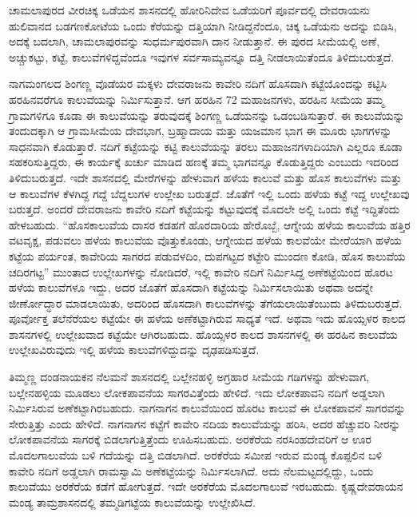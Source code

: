 ಚಾಮಲಾಪುರದ ವೀರಚಿಕ್ಕ ಒಡೆಯನ ಶಾಸನದಲ್ಲಿ ಹೋರಿನಿದೇವ ಒಡೆಯರಿಗೆ ಪೂರ್ವದಲ್ಲಿ ದೇವರಾಯನು ಹುಲಿವಾನದ ಬಡಗಣಕೋಟೆಯ ಒಂದು ಕೆರೆಯನ್ನು ದತ್ತಿಯಾಗಿ ನೀಡಿದ್ದನೆಂದೂ, ಚಿಕ್ಕ ಒಡೆಯನು ಅದನ್ನು ಬಿಡಿಸಿ, ಅದಕ್ಕೆ ಬದಲಾಗಿ, ಚಾಮಲಾಪುರವನ್ನು ಸುಧರ್ಮಪುರವಾಗಿ ದಾನ ನೀಡುತ್ತಾನೆ. ಈ ಪುರದ ಸೀಮೆಯಲ್ಲಿ ಅಣೆ, ಅಚ್ಚುಕಟ್ಟು, ಕಟ್ಟೆ, ಕಾಲುವೆಗಳಿದ್ದವೆಂದೂ ಇವುಗಳ ಸರ್ವಸಾಮ್ಯವನ್ನೂ ದತ್ತಿ ನೀಡಲಾಯಿತೆಂದೂ ತಿಳಿದುಬರುತ್ತದೆ.

ನಾಗಮಂಗಲದ ಶಿಂಗಣ್ಣ ವೊಡೆಯರ ಮಕ್ಕಳು ದೇವರಾಜನು ಕಾವೇರಿ ನದಿಗೆ ಹೊಸದಾಗಿ ಕಟ್ಟೆಯೊಂದನ್ನು ಕಟ್ಟಿಸಿ ಹರಹಿನವರೆಗೂ ಕಾಲುವೆಯನ್ನು ನಿರ್ಮಿಸುತ್ತಾನೆ. ಆಗ ಹರಹಿನ 72 ಮಹಾಜನಗಳು, ಹರಹಿನ ಸೀಮೆಯ ತಮ್ಮ ಗ್ರಾಮಗಳಿಗೂ ಕೂಡಾ ಈ ಕಾಲುವೆಯನ್ನು ತರುವುದಕ್ಕೆ ಶಿಂಗಣ್ಣ ಒಡೆಯನನ್ನು ಒಡಂಬಡಿಸುತ್ತಾರೆ. ಈ ಕಾಲುವೆಯನ್ನು ತಂದುದಕ್ಕಾಗಿ ಆ ಗ್ರಾಮಸೀಮೆಯ ದೇವಭಾಗ, ಬ್ರಹ್ಮಾದಾಯ ಮತ್ತು ಯಜಮಾನ ಭಾಗ ಈ ಮೂರು ಭಾಗಗಳನ್ನು ಸಾಧನವಾಗಿ ಕೊಡುತ್ತಾರೆ. ನದಿಗೆ ಕಟ್ಟೆಯನ್ನು ಕಟ್ಟಿ ಕಾಲುವೆಯನ್ನು ತರಲು ಮಹಾಜನಗಳಾದಿಯಾಗಿ ಎಲ್ಲರೂ ಕೂಡಾ ಸಹಕರಿಸುತ್ತಿದ್ದರು, ಈ ಕಾರ್ಯಕ್ಕೆ ಖರ್ಚು ಮಾಡಿದ ಹಣಕ್ಕೆ ತಮ್ಮ ಭಾಗವನ್ನೂ ಕೊಡುತ್ತಿದ್ದರು ಎಂಬುದು ಇದರಿಂದ ತಿಳಿದುಬರುತ್ತದೆ. ಇದೇ ಶಾಸನದಲ್ಲಿ ಮೇರೆಗಳನ್ನು ಹೇಳುವಾಗ ಹಳೆಯ ಕಾಲುವೆ ಮತ್ತು ಹೊಸ ಕಾಲುವೆಗಳು ಮತ್ತು ಆ ಕಾಲುವೆಗಳ ಕೆಳಗಿದ್ದ ಗದ್ದೆ ಬೆದ್ದಲುಗಳ ಉಲ್ಲೇಖ ಬರುತ್ತದೆ. ಜೊತೆಗೆ ಇಲ್ಲಿ ಒಂದು ಹಳೆಯ ಕಟ್ಟೆ ಇದ್ದ ಉಲ್ಲೇಖವು ಬರುತ್ತದೆ. ಅಂದರೆ ದೇವರಾಜನು ಕಾವೇರಿ ನದಿಗೆ ಕಟ್ಟೆಯನ್ನು ಕಟ್ಟುವುದಕ್ಕೆ ಮೊದಲೇ ಅಲ್ಲಿ ಒಂದು ಕಟ್ಟೆ ಇದ್ದಿತೆಂದು ಹೇಳಬಹುದು. “ಹೊಸಕಾಲುವೆಯ ದಾಸರ ಕಡಹಗೆ ಹೊರದಾರಿಯ ಹೇರೊಬ್ಬೆ, ಆಗ್ನೇಯ ಹಳೆಯ ಕಾಲುವೆಯ ಹತ್ತಿರ ವಟವೃಕ್ಷ, ಪಡುವಲು ಹಳೆಯ ಕಾಲುವೆಯ ವೊತ್ತುಕೊಂಡು, ಆಗ್ನೇಯದ ಹಳೆಯ ಕಾಲವೆಯೇ ಮೇರೆಯಾಗಿ ಹಳೆಯ ಕಟ್ಟೆಯ ಪರ್ಯಂತ, ಕಾವೇರಿಯ ಸಾಗರದ ಪಡುವಳದಿಂ, ದುಪಗಟ್ಟದ ಕಟ್ಟೇರಿ ಮುಂದಣ ಕೋಡಿ, ಹೊಸ ಕಾಲುವೆಯ ಚದಿರಗಟ್ಟ” ಮುಂತಾದ ಉಲ್ಲೇಖಗಳನ್ನು ನೋಡಿದರೆ, ಇಲ್ಲಿ ಕಾವೇರಿ ನದಿಗೆ ನಿರ್ಮಿಸಿದ್ದ ಅಣೆಕಟ್ಟೆಯಿಂದ ಹೊರಟ ಹಳೆಯ ಕಾಲುವೆಗಳೂ ಇದ್ದು, ಅದರ ಜೊತೆಗೆ ಹೊಸದಾಗಿ ಕಟ್ಟೆಯನ್ನು ನಿರ್ಮಿಸಲಾಯಿತು ಅಥವಾ ಅದನ್ನೇ ಜೀರ್ಣೋದ್ಧಾರ ಮಾಡಲಾಯಿತು, ಅದರಿಂದ ಹೊಸದಾಗಿ ಕಾಲುವೆಗಳನ್ನು ತೆಗೆಯಲಾಯಿತೆಂಬುದು ತಿಳಿದುಬರುತ್ತದೆ. ಪೂರ್ವೋಕ್ತ ತಲೆನೆರೆಯಲ ಕಟ್ಟೆಯೇ ಈ ಹಳೆಯ ಅಣೆಕಟ್ಟಾಗಿರುವ ಸಾಧ್ಯತೆ ಇದೆ. ಅಥವಾ ಇದು ಹೊಯ್ಸಳರ ಕಾಲದ ಶಾಸನಗಳಲ್ಲಿ ಉಲ್ಲೇಖವಾದ ಕಟ್ಟೆಯೇ ಆಗಿರಬಹುದು. ಹೊಯ್ಸಳರ ಕಾಲದ ಶಾಸನಗಳಲ್ಲಿ ಈ ಹರಹಿನ ಕಾಲುವೆಯ ಉಲ್ಲೇಖವಿರುವುದು ಇಲ್ಲಿ ಹಳೆಯ ಕಾಲುವೆಗಳಿದ್ದುದನ್ನು ದೃಢಪಡಿಸುತ್ತದೆ.

ತಿಮ್ಮಣ್ಣ ದಂಡನಾಯಕನ ನೆಲಮನೆ ಶಾಸನದಲ್ಲಿ ಬಲ್ಲೇನಹಳ್ಳಿ ಅಗ್ರಹಾರ ಸೀಮೆಯ ಗಡಿಗಳನ್ನು ಹೇಳುವಾಗ, ಬಲ್ಲೇನಹಳ್ಳಿಯ ಮೂಡಲು ಲೋಕಪಾವನೆಯ ಸಾಗರವಿತ್ತೆಂದು ಹೇಳಿದೆ. ಇದು ಲೋಕಪಾವನಿ ನದಿಗೆ ಅಡ್ಡಲಾಗಿ ನಿರ್ಮಿಸಿರುವ ಅಣೆಕಟ್ಟಾಗಿರಬಹುದು. ನಾಗನಾಗನ ಕಾಲುವೆಯಿಂದ ಹೊರಟ ಕಾಲುವೆ ಈ ಲೋಕಪಾವನೆ ಸಾಗರವನ್ನು ಸೇರುತ್ತಿತ್ತು ಎಂದು ಹೇಳಿದೆ. ನಾಗನಾಗನ ಕಟ್ಟೆಗೆ ಕಾವೇರಿ ನದಿಯ ಕಾಲುವೆಯನ್ನು ಹರಿಸಿ, ಅದರ ಹೆಚ್ಚುವರಿ ನೀರನ್ನು ಲೋಕಪಾವನೆಯ ಸಾಗರಕ್ಕೆ ಬಿಡಲಾಗುತ್ತಿತ್ತೆಂದು ಊಹಿಸಬಹುದು. ಅರಕೆರೆಯ ನರಸಿಂಹದೇವರಿಗೆ ಆ ಊರ ಮೊದಲಗಾಲುವೆಯ ಬಳಿ ಗದೆಯನ್ನು ದತ್ತಿ ಬಿಡಲಾಗಿದೆ.  ಅರಕೆರೆಯ ಸಮೀಪ ಇರುವ ಮಂಡ್ಯ ಕೊಪ್ಪಲಿನ ಬಳಿ ಕಾವೇರಿ ನದಿಗೆ ಅಡ್ಡಲಾಗಿ ರಾಮಸ್ವಾಮಿ ಅಣೆಕಟ್ಟೆಯನ್ನು ನಿರ್ಮಿಸಲಾಗಿದೆ. ಅದು ನೆಲಮಟ್ಟದಲ್ಲಿದ್ದು, ಒಂದು ಕಾಲುವೆಯು ಅರಕೆರೆಯ ಕಡೆಗೆ ಹೋಗುತ್ತದೆ. ಇದೇ ಅರಕೆರೆಯ ಮೊದಲಗಾಲುವೆ ಇರಬಹುದು. ಕೃಷ್ಣದೇವರಾಯನ ಮಂಡ್ಯ ತಾಮ್ರಶಾಸನದಲ್ಲಿ ತಮ್ಮಡಿಗಟ್ಟೆಯ ಕಾಲುವೆಯನ್ನು ಉಲ್ಲೇಖಿಸಿದೆ.

